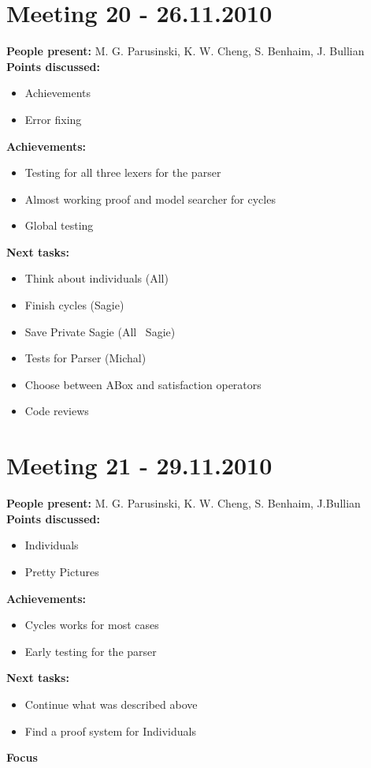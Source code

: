 \documentclass[12pt]{article}
\begin{document}
\section*{Meeting 20 - 26.11.2010}
\textbf{People present:} M. G. Parusinski, K. W. Cheng, S. Benhaim, J. Bullian \\
\textbf{Points discussed:}
\begin{itemize}
\item Achievements
\item Error fixing
\end{itemize}
\textbf{Achievements:}
\begin{itemize}
\item Testing for all three lexers for the parser
\item Almost working proof and model searcher for cycles
\item Global testing
\end{itemize}
\textbf{Next tasks:}
\begin{itemize}
\item Think about individuals (All)
\item Finish cycles (Sagie)
\item Save Private Sagie (All \ Sagie)
\item Tests for Parser (Michal)
\item Choose between ABox and satisfaction operators
\item Code reviews
\end{itemize}

\section*{Meeting 21 - 29.11.2010}
\textbf{People present:} M. G. Parusinski, K. W. Cheng, S. Benhaim, J.Bullian \\
\textbf{Points discussed:}
\begin{itemize}
\item Individuals
\item Pretty Pictures
\end{itemize}
\textbf{Achievements:}
\begin{itemize}
\item Cycles works for most cases
\item Early testing for the parser
\end{itemize}
\textbf{Next tasks:}
\begin{itemize}
\item Continue what was described above
\item Find a proof system for Individuals
\end{itemize}
\textbf{Focus}
\end{document}
